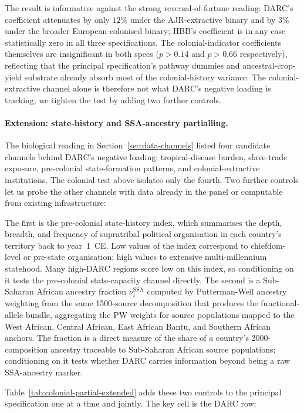 \documentclass[11pt,letterpaper]{article}
\begin{document}
The result is informative against the strong reversal-of-fortune reading: DARC's coefficient attenuates by only $12\%$ under the AJR-extractive binary and by $3\%$ under the broader European-colonised binary; HBB's coefficient is in any case statistically zero in all three specifications. The colonial-indicator coefficients themselves are insignificant in both specs ($p > 0.14$ and $p > 0.66$ respectively), reflecting that the principal specification's pathway dummies and ancestral-crop-yield substrate already absorb most of the colonial-history variance. The colonial-extractive channel alone is therefore not what DARC's negative loading is tracking; we tighten the test by adding two further controls.

\paragraph{Extension: state-history and SSA-ancestry partialling.}
The biological reading in Section~\ref{sec:data-channels} listed four candidate channels behind DARC's negative loading: tropical-disease burden, slave-trade exposure, pre-colonial state-formation patterns, and colonial-extractive institutions. The colonial test above isolates only the fourth. Two further controls let us probe the other channels with data already in the panel or computable from existing infrastructure:

The first is the \citet{borcan2018} pre-colonial state-history index, which summarises the depth, breadth, and frequency of supratribal political organisation in each country's territory back to year~1~CE. Low values of the index correspond to chiefdom-level or pre-state organisation; high values to extensive multi-millennium statehood. Many high-DARC regions score low on this index, so conditioning on it tests the pre-colonial state-capacity channel directly. The second is a Sub-Saharan African ancestry fraction $\nu_i^{\text{SSA}}$ computed by Putterman-Weil ancestry weighting from the same 1500-source decomposition that produces the functional-allele bundle, aggregating the PW weights for source populations mapped to the West African, Central African, East African Bantu, and Southern African anchors. The fraction is a direct measure of the share of a country's 2000-composition ancestry traceable to Sub-Saharan African source populations; conditioning on it tests whether DARC carries information beyond being a raw SSA-ancestry marker.

Table~\ref{tab:colonial-partial-extended} adds these two controls to the principal specification one at a time and jointly. The key cell is the DARC row:
\end{document}
